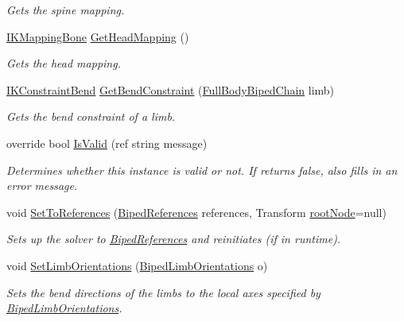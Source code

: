 \begin{DoxyCompactItemize}
\begin{DoxyCompactList}\small\item\em Gets the spine mapping. \end{DoxyCompactList}\item 
\mbox{\hyperlink{class_root_motion_1_1_final_i_k_1_1_i_k_mapping_bone}{I\+K\+Mapping\+Bone}} \mbox{\hyperlink{class_root_motion_1_1_final_i_k_1_1_i_k_solver_full_body_biped_a333b21503e002b5d745b0d688a51f362}{Get\+Head\+Mapping}} ()
\begin{DoxyCompactList}\small\item\em Gets the head mapping. \end{DoxyCompactList}\item 
\mbox{\hyperlink{class_root_motion_1_1_final_i_k_1_1_i_k_constraint_bend}{I\+K\+Constraint\+Bend}} \mbox{\hyperlink{class_root_motion_1_1_final_i_k_1_1_i_k_solver_full_body_biped_a44ea8d0cd6aee4c78d22f5c1d9732d5c}{Get\+Bend\+Constraint}} (\mbox{\hyperlink{namespace_root_motion_1_1_final_i_k_ae8848c0353270a08dcfe8b85a5c9b761}{Full\+Body\+Biped\+Chain}} limb)
\begin{DoxyCompactList}\small\item\em Gets the bend constraint of a limb. \end{DoxyCompactList}\item 
override bool \mbox{\hyperlink{class_root_motion_1_1_final_i_k_1_1_i_k_solver_full_body_biped_a3a3db44c5ef5d7a508492225ae161f10}{Is\+Valid}} (ref string message)
\begin{DoxyCompactList}\small\item\em Determines whether this instance is valid or not. If returns false, also fills in an error message. \end{DoxyCompactList}\item 
void \mbox{\hyperlink{class_root_motion_1_1_final_i_k_1_1_i_k_solver_full_body_biped_aa97e0a279a2cd49d947da470ca41a28f}{Set\+To\+References}} (\mbox{\hyperlink{class_root_motion_1_1_biped_references}{Biped\+References}} references, Transform \mbox{\hyperlink{class_root_motion_1_1_final_i_k_1_1_i_k_solver_full_body_biped_a9a18dc6b6c5d26df3e1ec2ab33b07239}{root\+Node}}=null)
\begin{DoxyCompactList}\small\item\em Sets up the solver to \mbox{\hyperlink{class_root_motion_1_1_biped_references}{Biped\+References}} and reinitiates (if in runtime). \end{DoxyCompactList}\item 
void \mbox{\hyperlink{class_root_motion_1_1_final_i_k_1_1_i_k_solver_full_body_biped_a4025a7fdeb436feb415e08583d4d22ac}{Set\+Limb\+Orientations}} (\mbox{\hyperlink{class_root_motion_1_1_biped_limb_orientations}{Biped\+Limb\+Orientations}} o)
\begin{DoxyCompactList}\small\item\em Sets the bend directions of the limbs to the local axes specified by \mbox{\hyperlink{class_root_motion_1_1_biped_limb_orientations}{Biped\+Limb\+Orientations}}. \end{DoxyCompactList}\end{DoxyCompactItemize}
